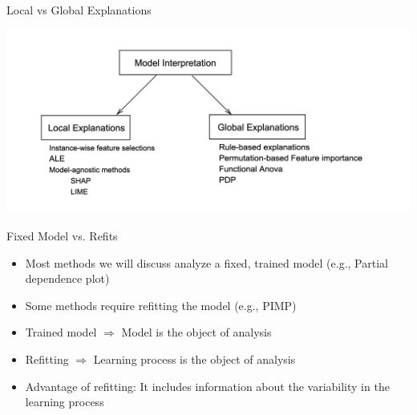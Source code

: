 \documentclass[11pt,compress,t,notes=noshow, aspectratio=169, xcolor=table]{beamer}
\begin{document}
\begin{frame}{Local vs Global Explanations}
	\begin{center}
		\includegraphics[width=\textwidth]{figure/1-local-global.png}
	\end{center}
\end{frame}


\begin{frame}{Fixed Model vs. Refits}
	\begin{itemize}
		\itemsep1em
		\item Most methods we will discuss analyze a fixed, trained model (e.g., Partial dependence plot)
		\item Some methods require refitting the model (e.g., PIMP)
		\item Trained model $\Rightarrow$ Model is the object of analysis
		\item Refitting $\Rightarrow$ Learning process is the object of analysis
		\item Advantage of refitting: It includes information about the variability in the learning process
	\end{itemize}
\end{frame}
\end{document}
